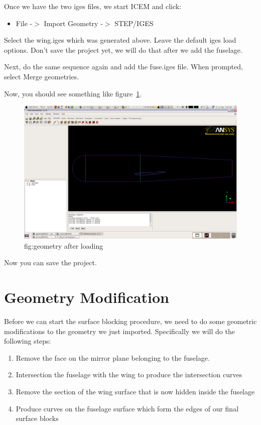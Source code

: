 \documentclass{report}
\begin{document}
Once we have the two iges files, we start ICEM and click: \\
\begin{itemize}
\item File -$>$ Import Geometry -$>$ STEP/IGES
\end{itemize}
Select the wing.iges which was generated above. Leave the default iges load options. Don't save the project yet, we will do that after we add the fuselage.

Next, do the same sequence again and add the fuse.iges file. When prompted, select Merge geometries.

Now, you should see something like figure~\ref{fig:geo_load}.

\begin{figure}[htb]
 \centering
 \includegraphics[width=\textwidth,angle=0]{figures/fig1.png}
 \caption{fig:geometry after loading}
 \label{fig:geo_load}
\end{figure}

Now you can save the project.

\section{Geometry Modification}

Before we can start the surface blocking procedure, we need to do some geometric modifications to the geometry we just imported. Specifically we will do the following steps:

\begin{enumerate}
\item Remove the face on the mirror plane belonging to the fuselage.
\item Intersection the fuselage with the wing to produce the intersection curves
\item Remove the section of the wing surface that is now hidden inside the fuselage
\item Produce curves on the fuselage surface which form the edges of our final surface blocks
\end{enumerate}
\end{document}
